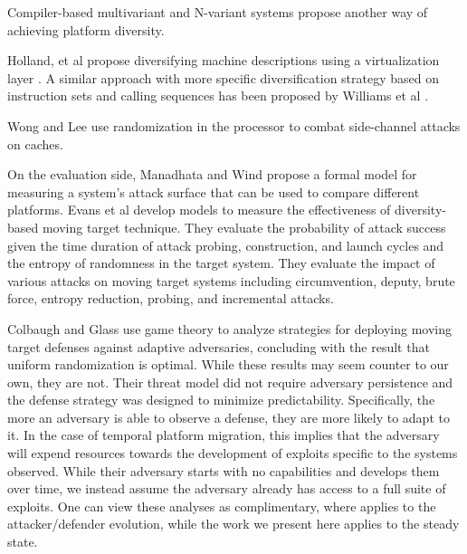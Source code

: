 \documentclass{acm_proc_article-sp}
\begin{document}
Compiler-based multivariant \cite{compilergenerated,reversestack,multivariant,multivariant2,multivariant3} and N-variant systems \cite {nvariant} propose another way of achieving platform diversity.

Holland, et al propose diversifying machine descriptions using a virtualization layer \cite{machinedesc}. A similar approach with more specific diversification strategy based on instruction sets and calling sequences has been proposed by Williams et al \cite{genesis}.

Wong and Lee \cite {cache} use randomization in the processor to combat side-channel attacks on caches. 

On the evaluation side, Manadhata and Wind \cite {attacksurface} propose a formal model for measuring a system's attack surface that can be used to compare different platforms. Evans et al \cite{mteffect} develop models to measure the effectiveness of diversity-based moving target technique. They evaluate the probability of attack success given the time duration of attack probing, construction, and launch cycles and the entropy of randomness in the target system. They evaluate the impact of various attacks on moving target systems including circumvention, deputy, brute force, entropy reduction, probing, and incremental attacks.

Colbaugh and Glass \cite{Colbaugh&Glass:COEX12} use game theory to analyze strategies for deploying moving target defenses against adaptive adversaries, concluding with the result that uniform randomization is optimal. While these results may seem counter to our own, they are not. Their threat model did not require adversary persistence and the defense strategy was designed to minimize predictability. Specifically, the more an adversary is able to observe a defense, they are more likely to adapt to it. In the case of temporal platform migration, this implies that the adversary will expend resources towards the development of exploits specific to the systems observed. While their adversary starts with no capabilities and develops them over time, we instead assume the adversary already has access to a full suite of exploits. One can view these analyses as complimentary, where \cite{Colbaugh&Glass:COEX12} applies to the attacker/defender evolution, while the work we present here applies to the steady state.
\end{document}

